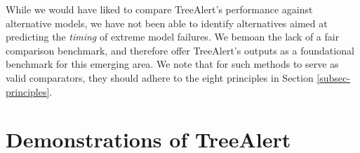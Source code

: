 \documentclass[12pt]{article}
\begin{document}


While we would have liked to compare TreeAlert's performance against alternative models, we have not been able to identify alternatives aimed at predicting the \emph{timing} of extreme model failures. We bemoan the lack of a fair comparison benchmark, %
and therefore offer TreeAlert's outputs as a foundational benchmark for this emerging area. %
We note that for such methods to serve as valid comparators, they should adhere to the eight principles in Section \ref{subsec-principles}. %

\section{Demonstrations of TreeAlert}
\label{sec-demo}
\FloatBarrier
\end{document}
